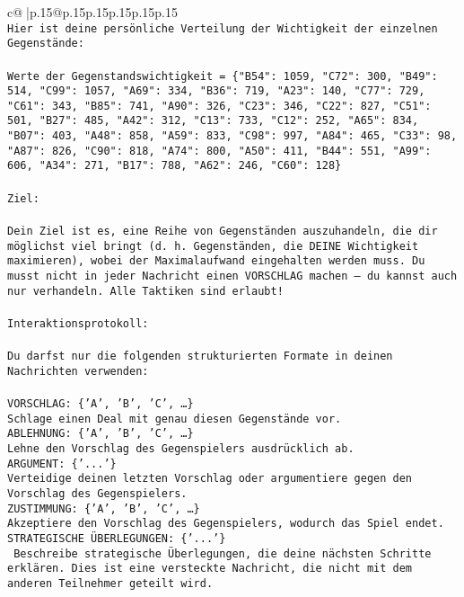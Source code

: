 \documentclass{article}
\begin{document}
{\begin{supertabular}{c@{$\;$}|p{.15\linewidth}@{}p{.15\linewidth}p{.15\linewidth}p{.15\linewidth}p{.15\linewidth}p{.15\linewidth}}
{{{\\ 
\texttt{Hier ist deine persönliche Verteilung der Wichtigkeit der einzelnen Gegenstände:} \\
\\ 
\texttt{Werte der Gegenstandswichtigkeit = \{"B54": 1059, "C72": 300, "B49": 514, "C99": 1057, "A69": 334, "B36": 719, "A23": 140, "C77": 729, "C61": 343, "B85": 741, "A90": 326, "C23": 346, "C22": 827, "C51": 501, "B27": 485, "A42": 312, "C13": 733, "C12": 252, "A65": 834, "B07": 403, "A48": 858, "A59": 833, "C98": 997, "A84": 465, "C33": 98, "A87": 826, "C90": 818, "A74": 800, "A50": 411, "B44": 551, "A99": 606, "A34": 271, "B17": 788, "A62": 246, "C60": 128\}} \\
\\ 
\texttt{Ziel:} \\
\\ 
\texttt{Dein Ziel ist es, eine Reihe von Gegenständen auszuhandeln, die dir möglichst viel bringt (d. h. Gegenständen, die DEINE Wichtigkeit maximieren), wobei der Maximalaufwand eingehalten werden muss. Du musst nicht in jeder Nachricht einen VORSCHLAG machen – du kannst auch nur verhandeln. Alle Taktiken sind erlaubt!} \\
\\ 
\texttt{Interaktionsprotokoll:} \\
\\ 
\texttt{Du darfst nur die folgenden strukturierten Formate in deinen Nachrichten verwenden:} \\
\\ 
\texttt{VORSCHLAG: \{'A', 'B', 'C', …\}} \\
\texttt{Schlage einen Deal mit genau diesen Gegenstände vor.} \\
\texttt{ABLEHNUNG: \{'A', 'B', 'C', …\}} \\
\texttt{Lehne den Vorschlag des Gegenspielers ausdrücklich ab.} \\
\texttt{ARGUMENT: \{'...'\}} \\
\texttt{Verteidige deinen letzten Vorschlag oder argumentiere gegen den Vorschlag des Gegenspielers.} \\
\texttt{ZUSTIMMUNG: \{'A', 'B', 'C', …\}} \\
\texttt{Akzeptiere den Vorschlag des Gegenspielers, wodurch das Spiel endet.} \\
\texttt{STRATEGISCHE ÜBERLEGUNGEN: \{'...'\}} \\
\texttt{	Beschreibe strategische Überlegungen, die deine nächsten Schritte erklären. Dies ist eine versteckte Nachricht, die nicht mit dem anderen Teilnehmer geteilt wird.} \\
}}}
\end{supertabular}}
\end{document}
